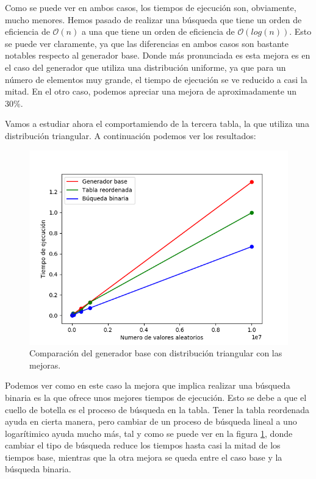\documentclass[11pt,a4paper]{report}
\begin{document}
Como se puede ver en ambos casos, los tiempos de ejecución son, obviamente, mucho menores. Hemos pasado de realizar una búsqueda
que tiene un orden de eficiencia de $\mathcal{O}(n)$ a una que tiene un orden de eficiencia de $\mathcal{O}(log(n))$. Esto se
puede ver claramente, ya que las diferencias en ambos casos son bastante notables respecto al generador base. Donde más
pronunciada es esta mejora es en el caso del generador que utiliza una distribución uniforme, ya que para un número de elementos
muy grande, el tiempo de ejecución se ve reducido a casi la mitad. En el otro caso, podemos apreciar una mejora de aproximadamente
un 30\%.

Vamos a estudiar ahora el comportamiendo de la tercera tabla, la que utiliza una distribución triangular. A continuación
podemos ver los resultados:

\begin{figure}[H]
\centering
\includegraphics[scale=0.55]{img/mejora2c.png}
\caption{Comparación del generador base con distribución triangular con las mejoras.}
\label{fig:mejora2c}
\end{figure}

Podemos ver como en este caso la mejora que implica realizar una búsqueda binaria es la que ofrece unos mejores tiempos de
ejecución. Esto se debe a que el cuello de botella es el proceso de búsqueda en la tabla. Tener la tabla reordenada ayuda
en cierta manera, pero cambiar de un proceso de búsqueda lineal a uno logarítimico ayuda mucho más, tal y como se puede ver
en la figura \ref{fig:mejora2c}, donde cambiar el tipo de búsqueda reduce los tiempos hasta casi la mitad de los tiempos
base, mientras que la otra mejora se queda entre el caso base y la búsqueda binaria.
\end{document}
